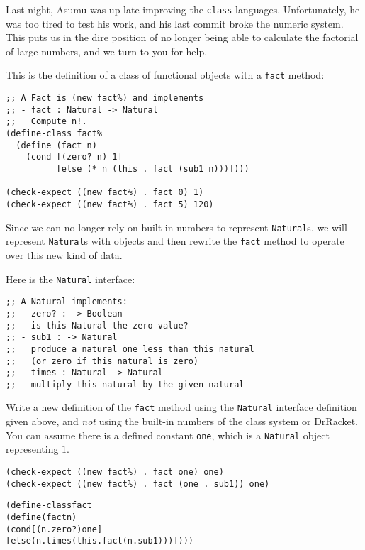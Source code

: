 \documentclass[12pt]{article}                   %
\def\pts#1{\marginpar{\footnotesize \raggedright  \fbox{#1 {\sc Points}}}}
\newenvironment{solution}{\color{red}}{}
\begin{document}
\begin{problem} \pts{18}
Last night, Asumu was up late improving the {\tt class} languages.
Unfortunately, he was too tired to test his work, and his last commit
broke the numeric system.
%
This puts us in the dire position of no longer being able to calculate
the factorial of large numbers, and we turn to you for help.

This is the definition of a class of functional objects
with a {\tt fact} method:

\begin{verbatim}
;; A Fact is (new fact%) and implements 
;; - fact : Natural -> Natural
;;   Compute n!.
(define-class fact%
  (define (fact n)
    (cond [(zero? n) 1]
          [else (* n (this . fact (sub1 n)))])))

(check-expect ((new fact%) . fact 0) 1)
(check-expect ((new fact%) . fact 5) 120)
\end{verbatim}

Since we can no longer rely on built in numbers to represent
\verb|Natural|s, we will represent \verb|Natural|s with objects and
then rewrite the \verb|fact| method to operate over this new kind of
data.

Here is the \verb|Natural| interface:

\begin{verbatim}
;; A Natural implements:
;; - zero? : -> Boolean
;;   is this Natural the zero value?
;; - sub1 : -> Natural
;;   produce a natural one less than this natural 
;;   (or zero if this natural is zero)
;; - times : Natural -> Natural
;;   multiply this natural by the given natural
\end{verbatim}

\newpage
Write a new definition of the \verb|fact| method using the
\verb|Natural| interface definition given above, and \emph{not} using
the built-in numbers of the class system or DrRacket.  You can assume
there is a defined constant \verb|one|, which is a \verb|Natural|
object representing $1$.

\begin{verbatim}
(check-expect ((new fact%) . fact one) one)
(check-expect ((new fact%) . fact (one . sub1)) one)
\end{verbatim}


\begin{solution}
\begin{alltt}
(define-class fact%
  (define (fact n)
    (cond [(n . zero?) one]
          [else (n . times (this . fact (n . sub1)))])))


\end{alltt}
\end{solution}
\end{problem}
\end{document}
